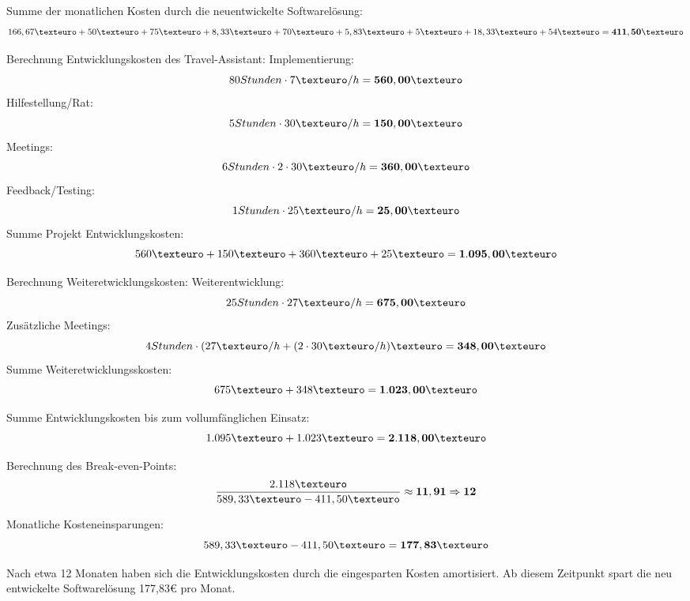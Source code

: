 Summe der monatlichen Kosten durch die neuentwickelte Softwarelösung: \[166,67€ + 50€ + 75€ + 8,33€ + 70€ + 5,83€ + 5€ + 18,33€ +54€ =  \bf{411,50€} \]

Berechnung Entwicklungskosten des Travel-Assistant:
	Implementierung: \[ 80 Stunden \cdot 7€/h =  \bf{560,00€} \]
	Hilfestellung/Rat: \[ 5 Stunden \cdot 30€/h =  \bf{150,00€} \]
	Meetings: \[ 6 Stunden \cdot 2 \cdot 30€/h =  \bf{360,00€} \]
	Feedback/Testing: \[ 1 Stunden \cdot 25€/h =  \bf{25,00€} \]
Summe Projekt Entwicklungskosten: \[560€ + 150€ + 360€ + 25€ =  \bf{1.095,00€} \]

Berechnung Weiteretwicklungskosten:
	Weiterentwicklung: \[ 25 Stunden \cdot 27€/h =  \bf{675,00€} \]
	Zusätzliche Meetings: \[ 4 Stunden \cdot ( 27€/h + ( 2 \cdot 30€/h)€ =  \bf{348,00€} \]
Summe Weiteretwicklungsskosten: \[675€ + 348€ =  \bf{1.023,00€} \]

Summe Entwicklungskosten bis zum vollumfänglichen Einsatz: \[1.095€ + 1.023€ =  \bf{2.118,00€} \]

Berechnung des Break-even-Points: \[ \displaystyle\frac{2.118€}{589,33€ - 411,50€} \approx  \bf{11,91} \Rightarrow 12 \] 

Monatliche Kosteneinsparungen:
\[ 589,33€ - 411,50€ =  \bf{177,83€} \]

Nach etwa 12 Monaten haben sich die Entwicklungskosten durch die eingesparten Kosten amortisiert. Ab diesem Zeitpunkt spart die neu entwickelte Softwarelösung 177,83€ pro Monat.